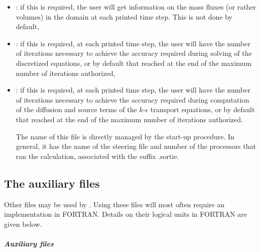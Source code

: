\begin{itemize}
\item {}:
if this is required, the user will get information on the mass fluxes
(or rather volumes) in the domain at each printed time step.
This is not done by default,

\item {}:
if this is required, at each printed time step, the user will have the number
of iterations necessary to achieve the accuracy required during
solving of the discretized equations, or by default that reached at the end
of the maximum number of iterations authorized,

\item {}:
if this is required, at each printed time step, the user will have
the number of iterations necessary to achieve the accuracy required
during computation of the diffusion and source terms of the $k$-$\epsilon$
transport equations,
or by default that reached at the end of the maximum number of iterations
authorized.

The name of this file is directly managed by the  start-up procedure.
In general, it has the name of the steering file and number of the processors
that ran the calculation, associated with the suffix .sortie.

\end{itemize}

\subsection{The auxiliary files}

Other files may be used by .
Using these files will most often require an implementation in FORTRAN.
Details on their logical units in FORTRAN are given below.

\subparagraph{Auxiliary files}

